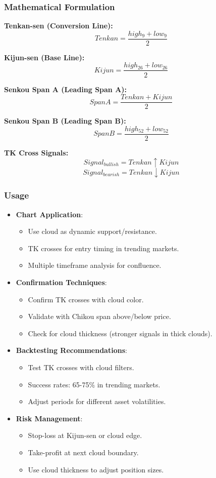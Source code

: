 \documentclass[12pt]{article}
\begin{document}
\subsubsection{Mathematical Formulation}
\textbf{Tenkan-sen (Conversion Line):}
\[
Tenkan = \frac{high_9 + low_9}{2}
\]

\textbf{Kijun-sen (Base Line):}
\[
Kijun = \frac{high_{26} + low_{26}}{2}
\]

\textbf{Senkou Span A (Leading Span A):}
\[
SpanA = \frac{Tenkan + Kijun}{2}
\]

\textbf{Senkou Span B (Leading Span B):}
\[
SpanB = \frac{high_{52} + low_{52}}{2}
\]

\textbf{TK Cross Signals:}
\[
Signal_{bullish} = Tenkan \uparrow Kijun
\]
\[
Signal_{bearish} = Tenkan \downarrow Kijun
\]

\subsubsection{Usage}
\begin{itemize}
\item \textbf{Chart Application}:
  \begin{itemize}
  \item Use cloud as dynamic support/resistance.
  \item TK crosses for entry timing in trending markets.
  \item Multiple timeframe analysis for confluence.
  \end{itemize}
\item \textbf{Confirmation Techniques}:
  \begin{itemize}
  \item Confirm TK crosses with cloud color.
  \item Validate with Chikou span above/below price.
  \item Check for cloud thickness (stronger signals in thick clouds).
  \end{itemize}
\item \textbf{Backtesting Recommendations}:
  \begin{itemize}
  \item Test TK crosses with cloud filters.
  \item Success rates: 65-75\% in trending markets.
  \item Adjust periods for different asset volatilities.
  \end{itemize}
\item \textbf{Risk Management}:
  \begin{itemize}
  \item Stop-loss at Kijun-sen or cloud edge.
  \item Take-profit at next cloud boundary.
  \item Use cloud thickness to adjust position sizes.
  \end{itemize}
\end{itemize}
\end{document}
